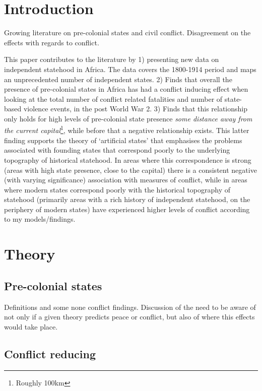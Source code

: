 \documentclass[12pt]{article}
\begin{document}
\begin{multicols}{2}

\section{Introduction}

Growing literature on pre-colonial states and civil conflict. Disagreement on
the effects with regards to conflict.

This paper contributes to the literature by 1) presenting new data on
independent statehood in Africa. The data covers the 1800-1914 period and maps
an unprecedented number of independent states. 2) Finds that overall the
presence of pre-colonial states in Africa has had a conflict inducing effect
when looking at the total number of conflict related fatalities and number of
state-based violence events, in the post World War 2. 3) Finds that this
relationship only holds for high levels of pre-colonial state presence
\textit{some distance away from the current capital}\footnote{Roughly 100km},
while before that a negative relationship exists. This latter finding supports
the theory of `artificial states' that emphasises the problems associated with
founding states that correspond poorly to the underlying topography of
historical statehood. In areas where this correspondence is strong (areas with
high state presence, close to the capital) there is a consistent negative (with
varying significance) association with measures of conflict, while in areas
where modern states correspond poorly with the historical topography of
statehood (primarily areas with a rich history of independent statehood, on the
periphery of modern states) have experienced higher levels of conflict according
to my models/findings.

\section{Theory}

\subsection{Pre-colonial states}

Definitions and some none conflict findings. Discussion of the need to be aware
of not only if a given theory predicts peace or conflict, but also of where this
effects would take place.

\subsection{Conflict reducing}


\end{multicols}
\end{document}
